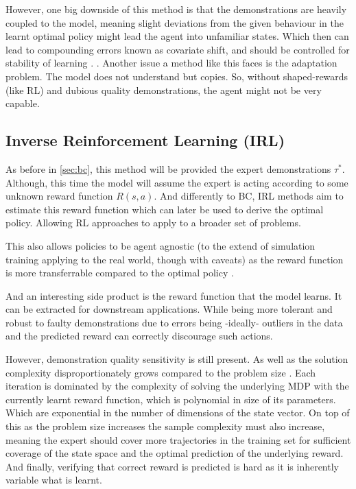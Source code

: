  However, one big downside of this method is that the demonstrations are heavily coupled to the model, meaning slight deviations from the given behaviour in the learnt optimal policy might lead the agent into unfamiliar states. Which then can lead to compounding errors known as covariate shift, and should be controlled for stability of learning \cite{mehta2024stablebccontrollingcovariateshift}. 
 \label{para:covariate-shift}. Another issue a method like this faces is the adaptation problem. The model does not understand but copies. So, without shaped-rewards (like RL) and dubious quality demonstrations, the agent might not be very capable.
 
\subsection{Inverse Reinforcement Learning (IRL)}
As before in \ref{sec:bc}, this method will be provided the expert demonstrations $\tau^*$. Although, this time the model will assume the expert is acting according to some unknown reward function $R\left(s, a\right)$. And differently to BC, IRL methods aim to estimate this reward function which can later be used to derive the optimal policy. Allowing RL approaches to apply to a broader set of problems.

This also allows policies to be agent agnostic (to the extend of simulation training applying to the real world, though with caveats) as the reward function is more transferrable compared to the optimal policy \cite{russell1998learning}.

And an interesting side product is the reward function that the model learns. It can be extracted for downstream applications. While being more tolerant and robust to faulty demonstrations due to errors being -ideally- outliers in the data and the predicted reward can correctly discourage such actions. 

However, demonstration quality sensitivity is still present. As well as the solution complexity disproportionately grows compared to the problem size \cite{ARORA2021103500}. Each iteration is dominated by the complexity of solving the underlying MDP with the currently learnt reward function, which is polynomial in size of its parameters. Which are exponential in the number of dimensions of the state vector. On top of this as the problem size increases the sample complexity must also increase, meaning the expert should cover more trajectories in the training set for sufficient coverage of the state space and the optimal prediction of the underlying reward. And finally, verifying that correct reward is predicted is hard as it is inherently variable what is learnt.


